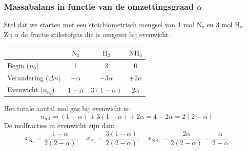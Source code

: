 \documentclass[11pt,a4paper]{article}
\begin{document}
\subsubsection{Massabalans in functie van de omzettingsgraad $\alpha$}
Stel dat we starten met een stoichiometrisch mengsel van 1 mol $\text{N}_2$ en 3 mol $\text{H}_2$. Zij $\alpha$ de fractie stikstofgas die is omgezet bij evenwicht.

\begin{table}[h]
    \centering
    \begin{tabular}{lccc}
        \toprule
        & $\text{N}_2$ & $\text{H}_2$ & $\text{NH}_3$ \\
        \midrule
        Begin ($n_0$) & 1 & 3 & 0 \\
        Verandering ($\Delta n$) & $-\alpha$ & $-3\alpha$ & $+2\alpha$ \\
        Evenwicht ($n_{eq}$) & $1-\alpha$ & $3(1-\alpha)$ & $2\alpha$ \\
        \bottomrule
    \end{tabular}
\end{table}

Het totale aantal mol gas bij evenwicht is:
\begin{equation}
    n_{\text{tot}} = (1-\alpha) + 3(1-\alpha) + 2\alpha = 4 - 2\alpha = 2(2-\alpha)
\end{equation}
De molfracties in evenwicht zijn dan:
\begin{equation}
    x_{\text{N}_2} = \frac{1-\alpha}{2(2-\alpha)}, \quad x_{\text{H}_2} = \frac{3(1-\alpha)}{2(2-\alpha)}, \quad x_{\text{NH}_3} = \frac{2\alpha}{2(2-\alpha)} = \frac{\alpha}{2-\alpha}
\end{equation}
\end{document}
